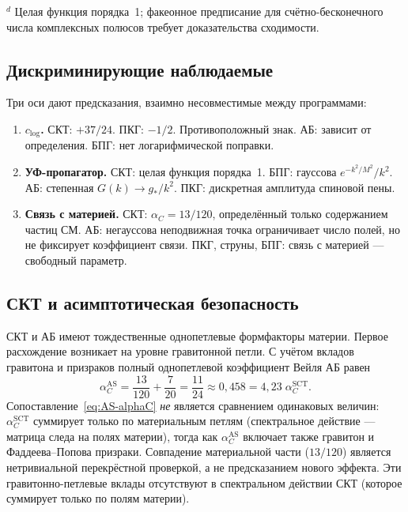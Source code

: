 \documentclass[12pt,a4paper]{article}
\theoremstyle{plain}
\theoremstyle{definition}
\theoremstyle{remark}
\begin{document}
{{{{{{\begin{table}[ht]
{\noindent ${}^d$ Целая функция порядка~1; факеонное предписание для
счётно-бесконечного числа комплексных полюсов требует доказательства
сходимости.}
\end{table}

\subsection{Дискриминирующие наблюдаемые}
\label{sec:discriminating}

Три оси дают предсказания, взаимно несовместимые между программами:
\begin{enumerate}[(1)]
\item \textbf{$c_{\log}$.} СКТ: $+37/24$. ПКГ: $-1/2$.
  Противоположный знак. АБ: зависит от определения. БПГ: нет
  логарифмической поправки.

\item \textbf{УФ-пропагатор.} СКТ: целая функция порядка~1.
  БПГ: гауссова $e^{-k^2/M^2}/k^2$. АБ: степенная
  $G(k) \to g_*/k^2$. ПКГ: дискретная амплитуда спиновой пены.

\item \textbf{Связь с материей.} СКТ: $\alpha_C = 13/120$,
  определённый только содержанием частиц СМ. АБ: негауссова
  неподвижная точка ограничивает число полей, но не фиксирует
  коэффициент связи. ПКГ, струны, БПГ: связь с материей ---
  свободный параметр.
\end{enumerate}

\subsection{СКТ и асимптотическая безопасность}
\label{sec:AS}

СКТ и АБ имеют тождественные однопетлевые формфакторы материи.
Первое расхождение возникает на уровне гравитонной петли.
С учётом вкладов гравитона и призраков полный однопетлевой
коэффициент Вейля АБ равен~\cite{SCM:2010}
\begin{equation}\label{eq:AS-alphaC}
  \alpha_C^{\mathrm{AS}} = \frac{13}{120} + \frac{7}{20}
  = \frac{11}{24} \approx 0{,}458
  = 4{,}23\;\alpha_C^{\mathrm{SCT}}.
\end{equation}
Сопоставление~\eqref{eq:AS-alphaC} \emph{не} является
сравнением одинаковых величин: $\alpha_C^{\mathrm{SCT}}$
суммирует только по материальным петлям (спектральное действие ---
матрица следа на полях материи), тогда как
$\alpha_C^{\mathrm{AS}}$ включает также гравитон и
Фаддеева--Попова призраки. Совпадение материальной части
($13/120$) является нетривиальной перекрёстной проверкой,
а не предсказанием нового эффекта.
Эти гравитонно-петлевые вклады отсутствуют в спектральном
действии СКТ (которое суммирует только по полям материи).

}}}}}}
\end{document}
